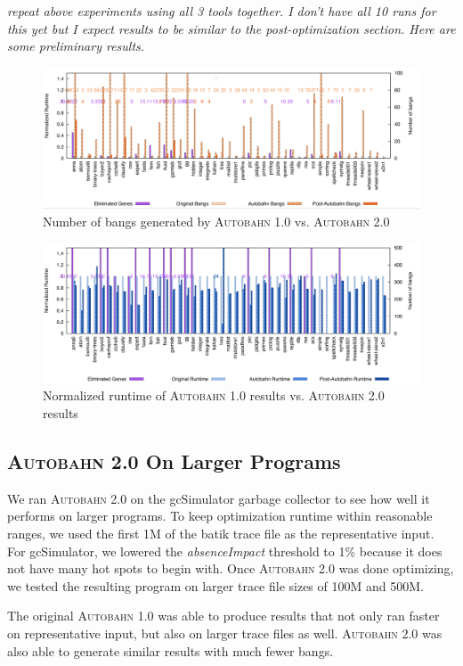 \documentclass[format=sigplan]{acmart}
\newcommand{\hotspots}[0]{hot spots}
\newcommand{\Ao}[0]{\textsc{Autobahn 1.0}}
\newcommand{\At}[0]{\textsc{Autobahn 2.0}}
\newcommand{\postopt}[0]{post-optimization}
\newcommand{\absim}[0]{\textit{absenceImpact}}
\begin{document}
\textit{repeat above experiments using all 3 tools together. I don't have all 10 runs for this yet but I expect results to be similar to the \postopt{} section. Here are some preliminary results.}

\begin{figure}
\includegraphics[width=\textwidth]{pap}
\caption{Number of bangs generated by \Ao{} vs. \At{}}
\end{figure}

\begin{figure}
\includegraphics[width=\textwidth]{pap2}
\caption{Normalized runtime of \Ao{} results vs. \At{} results}
\end{figure}

\subsection{\At{} On Larger Programs}

We ran \At{} on the gcSimulator garbage collector to see how well it performs on larger programs. To keep optimization runtime within reasonable ranges, we used the first 1M of the batik trace file as the representative input. For gcSimulator, we lowered the \absim{} threshold to 1\% because it does not have many \hotspots{} to begin with. Once \At{} was done optimizing, we tested the resulting program on larger trace file sizes of 100M and 500M. 

The original \Ao{} was able to produce results that not only ran faster on representative input, but also on larger trace files as well. \At{} was also able to generate similar results with much fewer bangs. 
\end{document}
